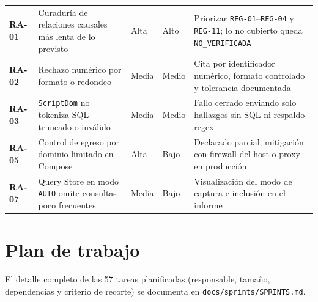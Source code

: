 \documentclass[12pt,a4paper]{article}
\begin{document}
\begin{longtable}{>{\bfseries}p{} p{} p{} p{} p{}}
RA-01 & Curaduría de relaciones causales más lenta de lo previsto & Alta & Alto & Priorizar \texttt{REG-01}--\texttt{REG-04} y \texttt{REG-11}; lo no cubierto queda \texttt{NO\_VERIFICADA} \\
RA-02 & Rechazo numérico por formato o redondeo & Media & Medio & Cita por identificador numérico, formato controlado y tolerancia documentada \\
RA-03 & \texttt{ScriptDom} no tokeniza SQL truncado o inválido & Media & Medio & Fallo cerrado enviando solo hallazgos sin SQL ni respaldo regex \\
RA-05 & Control de egreso por dominio limitado en Compose & Alta & Bajo & Declarado parcial; mitigación con firewall del host o proxy en producción \\
RA-07 & Query Store en modo \texttt{AUTO} omite consultas poco frecuentes & Media & Bajo & Visualización del modo de captura e inclusión en el informe \\
\end{longtable}
\endgroup

\section{Plan de trabajo}

El detalle completo de las 57 tareas planificadas (responsable, tamaño, dependencias y criterio de recorte) se documenta en \texttt{docs/sprints/SPRINTS.md}.
\end{document}
